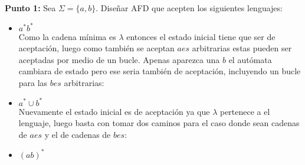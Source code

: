 \textbf{Punto 1: }Sea $\Sigma=\{a,b\}.$ Diseñar AFD que acepten los siguientes lenguajes:
\begin{itemize}[label={$\bullet$}]
    \item $a^*b^*$\\

     Como la cadena mínima es $\lambda$ entonces el estado inicial tiene que ser de aceptación, luego como también se aceptan $aes$ arbitrarias estas pueden ser aceptadas por medio de un bucle. Apenas aparezca una $b$ el autómata cambiara de estado pero ese seria también de aceptación, incluyendo un bucle para las $bes$ arbitrarias:\\
    \begin{basedtikz}
    \centering
    \end{basedtikz}

    \item $a^*\cup b^*$\\

     Nuevamente el estado inicial es de aceptación ya que $\lambda$ pertenece a el lenguaje, luego basta con tomar dos caminos para el caso donde sean cadenas de $aes$ y el de cadenas de $bes$:

      
    \begin{basedtikz}
    \centering
    \end{basedtikz}

    \item $(ab)^*$\\


\end{itemize}
